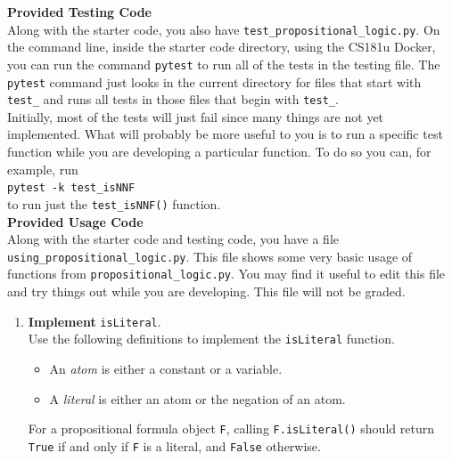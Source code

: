\documentclass[12pt]{article}
\newenvironment{problem}[2][Problem]{\begin{trivlist}
\item[\hskip \labelsep {\bfseries #1}\hskip \labelsep {\bfseries #2.}]}{\end{trivlist}}
\begin{document}
\begin{problem}{2}
\newpage

\textbf{Provided Testing Code} \\

Along with the starter code, you also have 
\texttt{test\_propositional\_logic.py}. On the command line, inside the starter code directory, using the CS181u Docker, you can run the command \texttt{pytest} to run all of the tests in the testing file. The \texttt{pytest} command just looks in the current directory for files that start with \texttt{test\_} and runs all tests in those files that begin with \texttt{test\_}. \\

Initially, most of the tests will just fail since many things are not yet implemented. What will probably be more useful to you is to run a specific test function while you are developing a particular function. To do so you can, for example, run \\

\texttt{pytest -k test\_isNNF} \\

to run just the \texttt{test\_isNNF()} function. \\


\textbf{Provided Usage Code} \\

Along with the starter code and testing code, you have a file \texttt{using\_propositional\_logic.py}. This file shows some very basic usage of functions from \texttt{propositional\_logic.py}. You may find it useful to edit this file and try things out while you are developing. This file will not be graded. 


\newpage 

\begin{enumerate}[label=\Alph*.]

\item \textbf{Implement} \texttt{isLiteral}. \\

Use the following definitions to implement the \texttt{isLiteral} function. 

\begin{itemize}
	\item An \textit{atom} is either a constant or a variable. 

	\item A \textit{literal} is either an atom or the negation of an atom. 
\end{itemize}

For a propositional formula object \texttt{F}, calling \texttt{F.isLiteral()} should return \texttt{True} if and only if \texttt{F} is a literal, and \texttt{False} otherwise. \\


\end{enumerate}
\end{problem}
\end{document}
